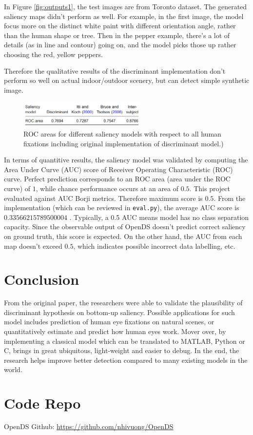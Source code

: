 \documentclass[conference]{IEEEtran}
\begin{document}
In Figure \ref{fig:outputs1}, the test images are from Toronto dataset. The generated saliency maps didn't perform as well. For example, in the first image, the model focus more on the distinct white paint with different orientation angle, rather than the human shape or tree. Then in the pepper example, there's a lot of details (as in line and contour) going on, and the model picks those up rather choosing the red, yellow peppers.

Therefore the qualitative results of the discriminant implementation don't perform so well on actual indoor/outdoor scenery, but can detect simple synthetic image. 

\begin{figure}[h]
    \centering
    \includegraphics[width=2.5in]{score.png}
    \caption{ROC areas for different saliency models with respect to all human fixations including original implementation of discriminant model.) }
    \label{fig:ROCscore}
\end{figure}

In terms of quantitive results, the saliency model was validated by computing the Area Under Curve (AUC) score of Receiver Operating Characteristic (ROC) curve. Perfect prediction corresponds to an ROC area (area under the ROC curve) of $1$, while chance performance occurs at an area of $0.5$. This project evaluated against AUC Borji metrics. Therefore maximum score is $0.5$. From the implementation (which can be reviewed in \texttt{eval.py}), the average AUC score is $0.33566215789500004$ . Typically, a 0.5 AUC means model has no class separation capacity. Since the observable output of OpenDS doesn't predict correct saliency on ground truth, this score is expected. On the other hand, the AUC from each map doesn't exceed $0.5$, which indicates possible incorrect data labelling, etc. 

\section{Conclusion}
From the original paper, the researchers were able to validate the plausibility of discriminant hypothesis on bottom-up saliency. Possible applications for such model includes prediction of human eye fixations on natural scenes, or quantitatively estimate and predict how human eyes work. Mover over, by implementing a classical model which can be translated to MATLAB, Python or C, brings in great ubiquitous, light-weight and easier to debug.
In the end, the research helps improve better detection compared to many existing models in the world.

\section{Code Repo}
OpenDS Github: \url{https://github.com/nhivuong/OpenDS}



\end{document}
